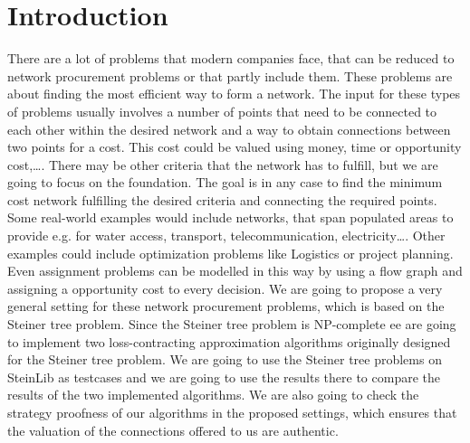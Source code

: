 
\chapter{Introduction}\label{chapter:introduction}

There are a lot of problems that modern companies face, that can be reduced to network procurement problems or that partly include them. These problems are about finding the most efficient way to form a network. The input for these types of problems usually involves a number of points that need to be connected to each other within the desired network and a way to obtain connections between two points for a cost. This cost could be valued using money, time or opportunity cost,\dots . There may be other criteria that the network has to fulfill, but we are going to focus on the foundation. The goal is in any case to find the minimum cost network fulfilling the desired criteria and connecting the required points. 
Some real-world examples would include networks, that span populated areas to provide e.g. for water access, transport, telecommunication, electricity\dots . Other examples could include optimization problems like Logistics or project planning. Even assignment problems can be modelled in this way by using a flow graph and assigning a opportunity cost to every decision. 
We are going to propose a very general setting for these network procurement problems, which is based on the Steiner tree problem. Since the Steiner tree problem is NP-complete ee are going to implement two loss-contracting approximation algorithms originally designed for the Steiner tree problem. We are going to use the Steiner tree problems on SteinLib \cite{Dui93} as testcases and we are going to use the results there to compare the results of the two implemented algorithms. We are also going to check the strategy proofness of our algorithms in the proposed settings, which ensures that the valuation of the connections offered to us are authentic.  